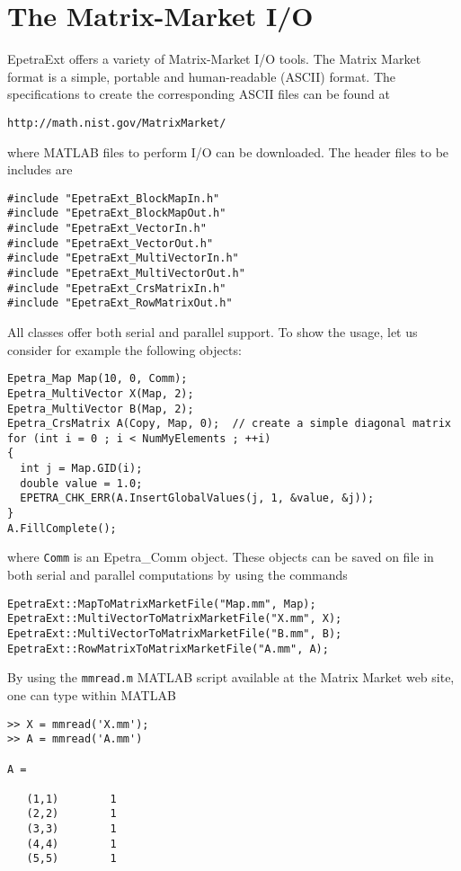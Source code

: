\documentclass[11pt,relax]{SANDreport}
\begin{document}
\section{The Matrix-Market I/O}
\label{sec:mm}

EpetraExt offers a variety of Matrix-Market I/O tools.
The Matrix Market format is a simple, portable and human-readable (ASCII)
format. The
specifications to create the corresponding ASCII files can be found at
\begin{verbatim}
http://math.nist.gov/MatrixMarket/
\end{verbatim}
where MATLAB files to perform I/O can be downloaded.
The header files to be includes are
\begin{verbatim}
#include "EpetraExt_BlockMapIn.h"
#include "EpetraExt_BlockMapOut.h"
#include "EpetraExt_VectorIn.h"
#include "EpetraExt_VectorOut.h"
#include "EpetraExt_MultiVectorIn.h"
#include "EpetraExt_MultiVectorOut.h"
#include "EpetraExt_CrsMatrixIn.h"
#include "EpetraExt_RowMatrixOut.h"
\end{verbatim}
All classes offer both serial and parallel support.
To show the usage, let us consider for example the following objects:
\begin{verbatim}
Epetra_Map Map(10, 0, Comm);
Epetra_MultiVector X(Map, 2);
Epetra_MultiVector B(Map, 2);
Epetra_CrsMatrix A(Copy, Map, 0);  // create a simple diagonal matrix
for (int i = 0 ; i < NumMyElements ; ++i)
{
  int j = Map.GID(i);
  double value = 1.0;
  EPETRA_CHK_ERR(A.InsertGlobalValues(j, 1, &value, &j));
}
A.FillComplete();
\end{verbatim}
where \verb!Comm! is an Epetra\_Comm object.
These objects can be saved on file
in both serial and parallel computations by using the commands
\begin{verbatim}
EpetraExt::MapToMatrixMarketFile("Map.mm", Map);
EpetraExt::MultiVectorToMatrixMarketFile("X.mm", X);
EpetraExt::MultiVectorToMatrixMarketFile("B.mm", B);
EpetraExt::RowMatrixToMatrixMarketFile("A.mm", A);
\end{verbatim}
By using the \verb!mmread.m! MATLAB
script available at the Matrix Market web site, one can type within MATLAB
\begin{verbatim}
>> X = mmread('X.mm');
>> A = mmread('A.mm')

A =

   (1,1)        1
   (2,2)        1
   (3,3)        1
   (4,4)        1
   (5,5)        1
\end{verbatim}
\end{document}
